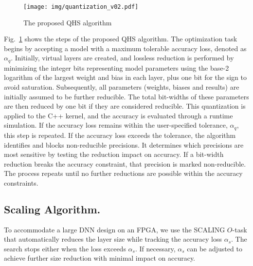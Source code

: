 
\begin{figure}
\begin{center}
\texttt{[image: img/quantization\_v02.pdf]}
\end{center}
   \caption{The proposed QHS algorithm}
\label{fig:quantization_algo}
\end{figure}

Fig.~\ref{fig:quantization_algo} shows the steps of the proposed QHS algorithm. The optimization task begins by accepting a model with a maximum tolerable accuracy loss, denoted as $\alpha_q$. Initially, virtual layers are created, and lossless reduction is performed by minimizing the integer bits representing model parameters using the base-2 logarithm of the largest weight and bias in each layer, plus one bit for the sign to avoid saturation. Subsequently, all parameters (weights, biases and results) are initially assumed to be further reducible. The total bit-widths of these parameters are then reduced by one bit if they are considered reducible. This quantization is applied to the C++ kernel, and the accuracy is evaluated through a runtime simulation. If the accuracy loss remains within the user-specified tolerance, $\alpha_q$, this step is repeated. If the accuracy loss exceeds the tolerance, the algorithm identifies and blocks non-reducible precisions. It determines which precisions are most sensitive by testing the reduction impact on accuracy. If a bit-width reduction breaks the accuracy constraint, that precision is marked non-reducible. The process repeats until no further reductions are possible within the accuracy constraints.





\subsection{Scaling Algorithm.} 
To accommodate a large DNN design on an FPGA, we use the SCALING $O$-task that automatically reduces the layer size while tracking the accuracy loss $\alpha_s$. The search stops either when the loss exceeds $\alpha_s$.  
If necessary, $\alpha_s$ can be adjusted to achieve further size reduction with minimal impact on accuracy. 



